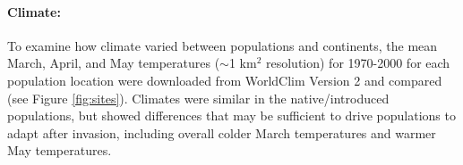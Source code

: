 \documentclass[11pt]{article}\usepackage[]{graphicx}\usepackage[]{color}
\begin{document}
	
	\paragraph{Climate:} 
	To examine how climate varied between populations and continents, the mean March, April, and May temperatures ($\sim$1 km$^2$ resolution) for 1970-2000 for each population location were downloaded from WorldClim Version 2 \parencite{Fick2017}  and compared (see Figure \ref{fig:sites}). Climates were similar in the native/introduced populations, but showed differences that may be sufficient to drive populations to adapt after invasion, including overall colder March temperatures and warmer May temperatures. 
	
\end{document}
